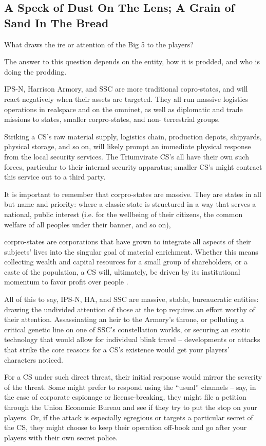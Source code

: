 \subsection{A Speck of Dust On The Lens; A Grain of Sand In The Bread}

What draws the ire or attention of the Big 5 to the players?

The answer to this question depends on the entity, how it is prodded, and who is doing the
prodding.

IPS-N, Harrison Armory, and SSC are more traditional copro-states, and will react negatively
when their assets are targeted. They all run massive logistics operations in realspace and on the
omninet, as well as diplomatic and trade missions to states, smaller corpro-states, and non-
terrestrial groups.

Striking a CS’s raw material supply, logistics chain, production depots, shipyards, physical
storage, and so on, will likely prompt an immediate physical response from the local security
services. The Triumvirate CS’s all have their own such forces, particular to their internal security
apparatus; smaller CS’s might contract this service out to a third party.

It is important to remember that corpro-states are massive. They are states in all but name and
priority: where a classic state is structured in a way that serves a national, public interest (i.e. for
the wellbeing of their citizens, the common welfare of all peoples under their banner, and so on),




corpro-states are corporations that have grown to integrate all aspects of their subjects’ lives into
the singular goal of material enrichment. Whether this means collecting wealth and capital
resources for a small group of shareholders, or a caste of the population, a CS will, ultimately, be
driven by its institutional momentum to favor profit over people .

All of this to say, IPS-N, HA, and SSC are massive, stable, bureaucratic entities: drawing the
undivided attention of those at the top requires an effort worthy of their attention. Assassinating an
heir to the Armory’s throne, or polluting a critical genetic line on one of SSC’s constellation worlds,
or securing an exotic technology that would allow for individual blink travel -- developments or
attacks that strike the core reasons for a CS’s existence would get your players’ characters
noticed.

For a CS under such direct threat, their initial response would mirror the severity of the threat.
Some might prefer to respond using the “usual” channels -- say, in the case of corporate
espionage or license-breaking, they might file a petition through the Union Economic Bureau and
see if they try to put the stop on your players. Or, if the attack is especially egregious or targets a
particular secret of the CS, they might choose to keep their operation off-book and go after your
players with their own secret police.

